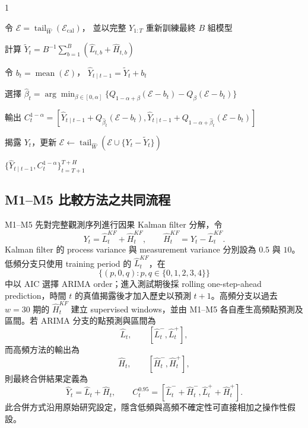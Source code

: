 \begin{algorithm}[htbp]
\begin{spacing}{1}
\begin{algorithmic}[1]
\State
令 $\mathcal E
=\operatorname{tail}_{\widehat W}
(\mathcal E_{\mathrm{cal}})$，
並以完整 $Y_{1:T}$ 重新訓練最終 $B$ 組模型


    \State
    計算
    $\widetilde Y_t
    =B^{-1}\sum_{b=1}^{B}
    (\widehat L_{t,b}+\widehat H_{t,b})$

    \State
    令 $b_t=\operatorname{mean}(\mathcal E)$，
    $\widehat Y_{t\mid t-1}=\widetilde Y_t+b_t$

    \State
    選擇
    $\widehat\beta_t
    =\arg\min_{\beta\in[0,\alpha]}
    \{Q_{1-\alpha+\beta}(\mathcal E-b_t)
    -Q_\beta(\mathcal E-b_t)\}$

    \State
    輸出
    $C_t^{1-\alpha}
    =[\widehat Y_{t\mid t-1}
    +Q_{\widehat\beta_t}(\mathcal E-b_t),
    \widehat Y_{t\mid t-1}
    +Q_{1-\alpha+\widehat\beta_t}(\mathcal E-b_t)]$

    \State
    揭露 $Y_t$，更新
    $\mathcal E\gets
    \operatorname{tail}_{\widehat W}
    (\mathcal E\cup\{Y_t-\widetilde Y_t\})$

\EndFor

\State \Return
$\{\widehat Y_{t\mid t-1},C_t^{1-\alpha}\}_{t=T+1}^{T+H}$

\end{algorithmic}
\end{spacing}
\end{algorithm}

\subsection{M1--M5 比較方法之共同流程}
\label{subsec:m1-m5-common}

M1--M5 先對完整觀測序列進行因果 Kalman filter 分解，令
\[
    Y_t=\widehat L_t^{KF}+\widehat H_t^{KF},
    \qquad
    \widehat H_t^{KF}=Y_t-\widehat L_t^{KF}.
\]
Kalman filter 的 process variance 與 measurement variance 分別設為 $0.5$ 與 $10$。低頻分支只使用 training period 的 $\widehat L_t^{KF}$，在
\[
    \{(p,0,q):p,q\in\{0,1,2,3,4\}\}
\]
中以 AIC 選擇 ARIMA order；進入測試期後採 rolling one-step-ahead prediction，時間 $t$ 的真值揭露後才加入歷史以預測 $t+1$。高頻分支以過去 $w=30$ 期的 $\widehat H_t^{KF}$ 建立 supervised windows，並由 M1--M5 各自產生高頻點預測及區間。若 ARIMA 分支的點預測與區間為
\[
    \widehat L_t,\qquad
    [\widehat L_t^{-},\widehat L_t^{+}],
\]
而高頻方法的輸出為
\[
    \widehat H_t,\qquad
    [\widehat H_t^{-},\widehat H_t^{+}],
\]
則最終合併結果定義為
\[
    \widehat Y_t=\widehat L_t+\widehat H_t,
    \qquad
    C_t^{0.95}=
    [\widehat L_t^{-}+\widehat H_t^{-},
     \widehat L_t^{+}+\widehat H_t^{+}].
\]
此合併方式沿用原始研究設定，隱含低頻與高頻不確定性可直接相加之操作性假設。

